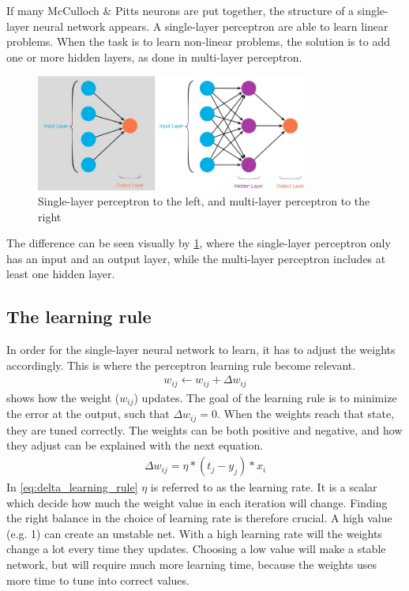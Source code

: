 \documentclass[USenglish]{ifimaster}  %
\begin{document}
If many McCulloch \& Pitts neurons are put together, the structure of a single-layer neural network appears. A single-layer perceptron are able to learn linear problems. When the task is to learn non-linear problems, the solution is to add one or more hidden layers, as done in multi-layer perceptron.   
\begin{figure}[ht]
    \centering
    \includegraphics[width=0.8\textwidth]{bilder/slp_&_mlp.jpeg}
    \caption{Single-layer perceptron to the left, and multi-layer perceptron to the right \cite{website:slp_mlp}}
    \label{fig:slp_mlp}
\end{figure}
The difference can be seen visually by \cref{fig:slp_mlp}, where the single-layer perceptron only has an input and an output layer, while the multi-layer perceptron includes at least one hidden layer.

\subsection{The learning rule}
In order for the single-layer neural network to learn, it has to adjust the weights accordingly. This is where the perceptron learning rule become relevant.
\begin{equation}\label{eq:learning_rule}
\begin{aligned}
w_{ij} \longleftarrow w_{ij} + \Delta w_{ij}
\end{aligned}
\end{equation}
 shows how the weight ($w_{ij}$) updates. The goal of the learning rule is to minimize the error at the output, such that $\Delta w_{ij} = 0 $. When the weights reach that state, they are tuned correctly. The weights can be both positive and negative, and how they adjust can be explained with the next equation. 
\begin{equation}\label{eq:delta_learning_rule}
\begin{aligned}
\Delta w_{ij} = \eta * (t_j - y_j) * x_i 
\end{aligned}
\end{equation}
In \cref{eq:delta_learning_rule} $\eta$ is referred to as the learning rate. It is a scalar which decide how much the weight value in each iteration will change. Finding the right balance in the choice of learning rate is therefore crucial. A high value (e.g. 1) can create an unstable net. With a high learning rate will the weights change a lot every time they updates. %
Choosing a low value will make a stable network, but will require much more learning time, because the weights uses more time to tune into correct values.
\end{document}
